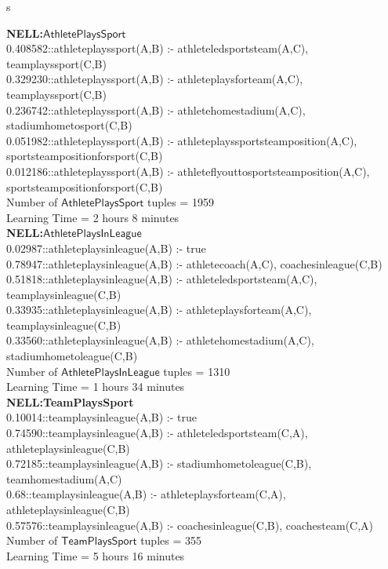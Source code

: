 \documentclass[akbc,twoside,11pt]{article}
\begin{document}
\begin{footnotesize}
{s      

\noindent \textbf{NELL:$\mathsf{AthletePlaysSport}$} \\
0.408582::athleteplayssport(A,B) :- athleteledsportsteam(A,C), teamplayssport(C,B) \\
0.329230::athleteplayssport(A,B) :- athleteplaysforteam(A,C), teamplayssport(C,B) \\
0.236742::athleteplayssport(A,B) :- athletehomestadium(A,C), stadiumhometosport(C,B) \\
0.051982::athleteplayssport(A,B) :- athleteplayssportsteamposition(A,C), sportsteampositionforsport(C,B) \\
0.012186::athleteplayssport(A,B) :- athleteflyouttosportsteamposition(A,C), sportsteampositionforsport(C,B) \\
Number of $\mathsf{AthletePlaysSport}$ tuples = 1959 \\
Learning Time = 2 hours 8 minutes \\ %

\noindent \textbf{NELL:$\mathsf{AthletePlaysInLeague}$} \\
0.02987::athleteplaysinleague(A,B) :- true \\
0.78947::athleteplaysinleague(A,B) :- athletecoach(A,C), coachesinleague(C,B) \\
0.51818::athleteplaysinleague(A,B) :- athleteledsportsteam(A,C), teamplaysinleague(C,B) \\
0.33935::athleteplaysinleague(A,B) :- athleteplaysforteam(A,C), teamplaysinleague(C,B) \\
0.33560::athleteplaysinleague(A,B) :- athletehomestadium(A,C), stadiumhometoleague(C,B) \\
Number of $\mathsf{AthletePlaysInLeague}$ tuples = 1310 \\
Learning Time = 1 hours 34 minutes \\ %

\noindent \textbf{NELL:TeamPlaysSport}  \\
0.10014::teamplaysinleague(A,B) :- true \\
0.74590::teamplaysinleague(A,B) :- athleteledsportsteam(C,A), athleteplaysinleague(C,B) \\
0.72185::teamplaysinleague(A,B) :- stadiumhometoleague(C,B), teamhomestadium(A,C) \\
0.68::teamplaysinleague(A,B) :- athleteplaysforteam(C,A), athleteplaysinleague(C,B) \\
0.57576::teamplaysinleague(A,B) :- coachesinleague(C,B), coachesteam(C,A) \\
Number of $\mathsf{TeamPlaysSport}$ tuples = 355 \\
Learning Time = 5 hours 16 minutes \\ %

}
\end{footnotesize}
\end{document}
